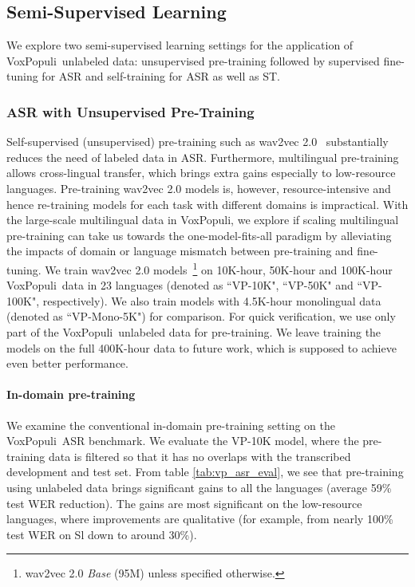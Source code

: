\documentclass[11pt,a4paper]{article}
\newcommand{\vp}{VoxPopuli}
\begin{document}
\subsection{Semi-Supervised Learning}
We explore two semi-supervised learning settings for the application of \vp~unlabeled data: unsupervised pre-training followed by supervised fine-tuning for ASR and self-training for ASR as well as ST.
\subsubsection{ASR with Unsupervised Pre-Training}
\label{sec:unsupervised_pretraining}
Self-supervised (unsupervised) pre-training such as wav2vec 2.0~\citep{baevski2020wav2vec} substantially reduces the need of labeled data in ASR. Furthermore, multilingual pre-training~\citep{conneau2020unsupervised} allows cross-lingual transfer, which brings extra gains especially to low-resource languages. Pre-training wav2vec 2.0 models is, however, resource-intensive and hence re-training models for each task with different domains is impractical. With the large-scale multilingual data in \vp,
we explore if scaling multilingual pre-training can take us towards the one-model-fits-all paradigm by alleviating the impacts of domain or language mismatch between pre-training and fine-tuning. We train wav2vec 2.0 models~\footnote{wav2vec 2.0 \emph{Base} (95M) unless specified otherwise.} on 10K-hour, 50K-hour and 100K-hour \vp~data in 23 languages (denoted as ``VP-10K", ``VP-50K" and ``VP-100K", respectively). We also train models with 4.5K-hour monolingual data (denoted as ``VP-Mono-5K") for comparison. For quick verification, we use only part of the \vp~unlabeled data for pre-training. We leave training the models on the full 400K-hour data to future work, which is supposed to achieve even better performance.

\paragraph{In-domain pre-training} We examine the conventional in-domain pre-training setting on the \vp~ASR benchmark. We evaluate the VP-10K model, where the pre-training data is filtered so that it has no overlaps with the transcribed development and test set. From table \ref{tab:vp_asr_eval}, we see that pre-training using unlabeled data brings significant gains to all the languages (average 59\% test WER reduction). The gains are most significant on the low-resource languages, where improvements are qualitative (for example, from nearly 100\% test WER on Sl down to around 30\%).
\end{document}
